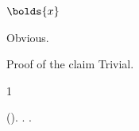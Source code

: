 \documentclass{arxbj}
\begin{document}
\setlength{\tablewidth}{5cm}
$\bolds{x}$
\begin{pf}
Obvious.
\end{pf}
\begin{pf*}{Proof of the claim}
Trivial.
\end{pf*}
\begin{thebibliography}{1}
\begin{barticle}
(). .   . 
\end{barticle}
\endbibitem
\end{thebibliography}
\end{document}
